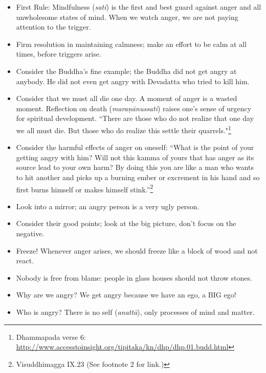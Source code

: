 \begin{itemize}
\item First Rule: Mindfulness (\textit{sati}) is the first and best guard against anger and all unwholesome states of mind. When we watch anger, we are not paying attention to the trigger.

\item Firm resolution in maintaining calmness; make an effort to be calm at all times, before triggers arise.

\item Consider the Buddha's fine example; the Buddha did not get angry at anybody. He did not even get angry with Devadatta who tried to kill him.

\item Consider that we must all die one day. A moment of anger is a wasted moment. Reflection on death (\textit{maraṇānussati}) raises one’s sense of urgency for spiritual development. ``There are those who do not realize that one day we all must die. But those who do realize this settle their quarrels."\footnote{Dhammapada verse 6: \url{http://www.accesstoinsight.org/tipitaka/kn/dhp/dhp.01.budd.html}}

\item Consider the harmful effects of anger on oneself: “What is the point of your getting angry with him? Will not this kamma of yours that has anger as its source lead to your own harm? By doing this you are like a man who wants to hit another and picks up a burning ember or excrement in his hand and so first burns himself or makes himself stink.”\footnote{Visuddhimagga IX.23 (See footnote 2 for link.)}

\item Look into a mirror; an angry person is a very ugly person.

\item Consider their good points; look at the big picture, don't focus on the negative.

\item Freeze! Whenever anger arises, we should freeze like a block of wood and not react.

\item Nobody is free from blame: people in glass houses should not throw stones.

\item Why are we angry? We get angry because we have an ego, a BIG ego!

\item Who is angry? There is no self (\textit{anattā}), only processes of mind and matter. 


\end{itemize}
